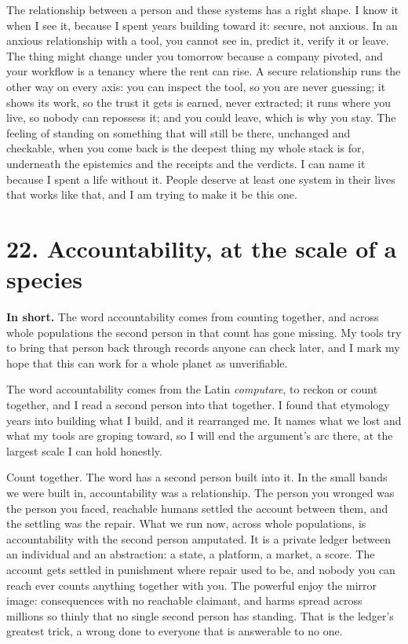 \documentclass[11pt]{article}
\begin{document}
The relationship between a person and these systems has a right shape. I know it when I see it, because I spent years building toward it: secure, not anxious. In an anxious relationship with a tool, you cannot see in, predict it, verify it or leave. The thing might change under you tomorrow because a company pivoted, and your workflow is a tenancy where the rent can rise. A secure relationship runs the other way on every axis: you can inspect the tool, so you are never guessing; it shows its work, so the trust it gets is earned, never extracted; it runs where you live, so nobody can repossess it; and you could leave, which is why you stay. The feeling of standing on something that will still be there, unchanged and checkable, when you come back is the deepest thing my whole stack is for, underneath the epistemics and the receipts and the verdicts. I can name it because I spent a life without it. People deserve at least one system in their lives that works like that, and I am trying to make it be this one.

\section*{22. Accountability, at the scale of a species}

\textbf{In short.} The word accountability comes from counting together, and across whole populations the second person in that count has gone missing. My tools try to bring that person back through records anyone can check later, and I mark my hope that this can work for a whole planet as unverifiable.

The word accountability comes from the Latin \emph{computare}, to reckon or count together, and I read a second person into that together. I found that etymology years into building what I build, and it rearranged me. It names what we lost and what my tools are groping toward, so I will end the argument's arc there, at the largest scale I can hold honestly.

Count together. The word has a second person built into it. In the small bands we were built in, accountability was a relationship. The person you wronged was the person you faced, reachable humans settled the account between them, and the settling was the repair. What we run now, across whole populations, is accountability with the second person amputated. It is a private ledger between an individual and an abstraction: a state, a platform, a market, a score. The account gets settled in punishment where repair used to be, and nobody you can reach ever counts anything together with you. The powerful enjoy the mirror image: consequences with no reachable claimant, and harms spread across millions so thinly that no single second person has standing. That is the ledger's greatest trick, a wrong done to everyone that is answerable to no one.
\end{document}
